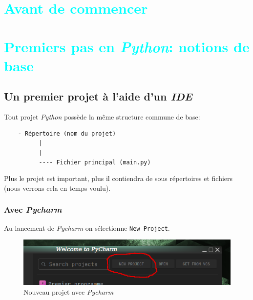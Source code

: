 \documentclass[a4paper,12pt]{book}
\title{\fbox{PYTHON de A à Y}}
\author{krystof}
\date{\today}
\begin{document}
\maketitle
\tableofcontents

\pagestyle{fancy}
\renewcommand{\headrulewidth}{1pt}
\renewcommand{\headsep}{15pt}
\setlength{\headheight}{1cm}
\lhead{\textcolor{cyan}{Chapitre \thechapter}}
\rhead{\thepage}
\cfoot{}

\part{\textcolor{cyan}{Avant de commencer}}



\part{\textcolor{cyan}{Premiers pas en \textit{Python}: notions de base}}


\chapter{Un premier projet à l'aide d'un \textit{IDE}}
Tout projet \textit{Python} possède la même structure commune de base:
\begin{verbatim}
    - Répertoire (nom du projet)
          |
          |
          ---- Fichier principal (main.py)
\end{verbatim}
\medskip

Plus le projet est important, plus il contiendra de sous répertoires et fichiers (nous verrons cela en temps voulu).
\medskip

\section{Avec \textit{Pycharm}}
Au lancement de \textit{Pycharm} on sélectionne \texttt{New Project}.
\begin{figure}[h]
\begin{center}
\includegraphics[scale=0.3]{IMG/Pycharm-01.png}
\caption{Nouveau projet avec \textit{Pycharm}}
\end{center}
\end{figure}
\medskip
\end{document}
